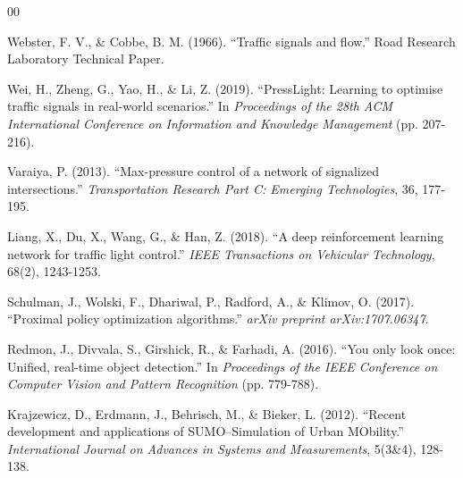 \documentclass[10pt,conference]{IEEEtran}
\begin{document}
\begin{thebibliography}{00}

 Webster, F. V., \& Cobbe, B. M. (1966). ``Traffic signals and flow.'' Road Research Laboratory Technical Paper.

 Wei, H., Zheng, G., Yao, H., \& Li, Z. (2019). ``PressLight: Learning to optimise traffic signals in real-world scenarios.'' In \textit{Proceedings of the 28th ACM International Conference on Information and Knowledge Management} (pp. 207-216).

 Varaiya, P. (2013). ``Max-pressure control of a network of signalized intersections.'' \textit{Transportation Research Part C: Emerging Technologies}, 36, 177-195.

 Liang, X., Du, X., Wang, G., \& Han, Z. (2018). ``A deep reinforcement learning network for traffic light control.'' \textit{IEEE Transactions on Vehicular Technology}, 68(2), 1243-1253.

 Schulman, J., Wolski, F., Dhariwal, P., Radford, A., \& Klimov, O. (2017). ``Proximal policy optimization algorithms.'' \textit{arXiv preprint arXiv:1707.06347}.

 Redmon, J., Divvala, S., Girshick, R., \& Farhadi, A. (2016). ``You only look once: Unified, real-time object detection.'' In \textit{Proceedings of the IEEE Conference on Computer Vision and Pattern Recognition} (pp. 779-788).

 Krajzewicz, D., Erdmann, J., Behrisch, M., \& Bieker, L. (2012). ``Recent development and applications of SUMO--Simulation of Urban MObility.'' \textit{International Journal on Advances in Systems and Measurements}, 5(3\&4), 128-138.

\end{thebibliography}
\end{document}
